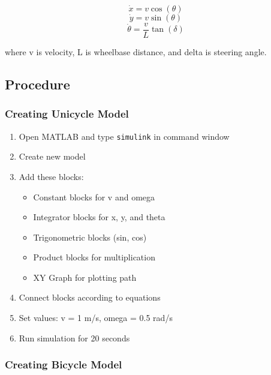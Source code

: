\begin{equation}
\dot{x} = v \cos(\theta)
\end{equation}
\begin{equation}
\dot{y} = v \sin(\theta)
\end{equation}
\begin{equation}
\dot{\theta} = \frac{v}{L} \tan(\delta)
\end{equation}

where v is velocity, L is wheelbase distance, and delta is steering angle.

\subsection{Procedure}

\subsubsection{Creating Unicycle Model}

\begin{enumerate}
	\item Open MATLAB and type \texttt{simulink} in command window
	\item Create new model
	\item Add these blocks:
	\begin{itemize}
		\item Constant blocks for v and omega
		\item Integrator blocks for x, y, and theta
		\item Trigonometric blocks (sin, cos)
		\item Product blocks for multiplication
		\item XY Graph for plotting path
	\end{itemize}
	\item Connect blocks according to equations
	\item Set values: v = 1 m/s, omega = 0.5 rad/s
	\item Run simulation for 20 seconds
\end{enumerate}

\subsubsection{Creating Bicycle Model}

